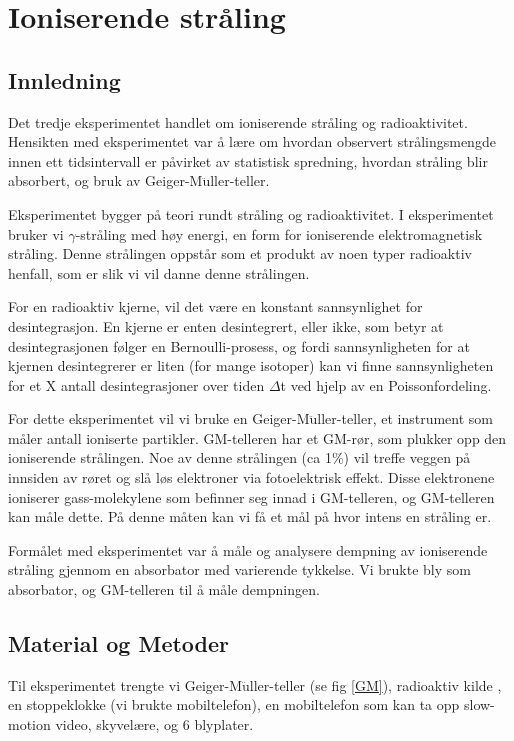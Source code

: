 \section{Ioniserende stråling}

\subsection{Innledning}

Det tredje eksperimentet handlet om ioniserende stråling og radioaktivitet. Hensikten med eksperimentet var å lære om hvordan observert strålingsmengde innen ett tidsintervall er påvirket av statistisk spredning, hvordan stråling blir absorbert, og bruk av Geiger-M$\ddot{\text{u}}$ller-teller. \medskip

Eksperimentet bygger på teori rundt stråling og radioaktivitet. I eksperimentet bruker vi $\gamma$-stråling med høy energi, en form for ioniserende elektromagnetisk stråling. Denne strålingen oppstår som et produkt av noen typer radioaktiv henfall, som er slik vi vil danne denne strålingen.

For en radioaktiv kjerne, vil det være en konstant sannsynlighet for desintegrasjon. En kjerne er enten desintegrert, eller ikke, som betyr at desintegrasjonen følger en Bernoulli-prosess, og fordi sannsynligheten for at kjernen desintegrerer er liten (for mange isotoper) kan vi finne sannsynligheten for et X antall desintegrasjoner over tiden $\Delta$t ved hjelp av en Poissonfordeling.

For dette eksperimentet vil vi bruke en Geiger-M$\ddot{\text{u}}$ller-teller, et instrument som måler antall ioniserte partikler. GM-telleren har et GM-rør, som plukker opp den ioniserende strålingen. 
Noe av denne strålingen (ca 1\%) vil treffe veggen på innsiden av røret og slå løs elektroner via fotoelektrisk effekt. Disse elektronene ioniserer gass-molekylene som befinner seg innad i GM-telleren, og GM-telleren kan måle dette. På denne måten kan vi få et mål på hvor intens en stråling er.\medskip

Formålet med eksperimentet var å måle og analysere dempning av ioniserende stråling gjennom en
absorbator med varierende tykkelse. Vi brukte bly som absorbator, og GM-telleren til å måle dempningen.

\subsection{Material og Metoder}

Til eksperimentet trengte vi Geiger-M$\ddot{\text{u}}$ller-teller (se fig \ref{GM}), radioaktiv kilde , en stoppeklokke (vi brukte mobiltelefon), en mobiltelefon som kan ta opp slow-motion video, skyvelære, og 6 blyplater.\medskip

